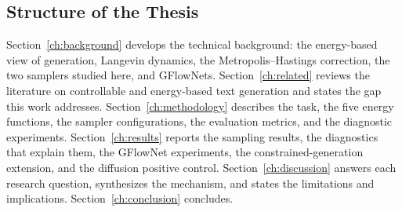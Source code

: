 \subsection{Structure of the Thesis}
\label{sec:intro-structure}

Section~\ref{ch:background} develops the technical background: the energy-based view of generation, Langevin dynamics, the Metropolis--Hastings correction, the two samplers studied here, and GFlowNets. Section~\ref{ch:related} reviews the literature on controllable and energy-based text generation and states the gap this work addresses. Section~\ref{ch:methodology} describes the task, the five energy functions, the sampler configurations, the evaluation metrics, and the diagnostic experiments. Section~\ref{ch:results} reports the sampling results, the diagnostics that explain them, the GFlowNet experiments, the constrained-generation extension, and the diffusion positive control. Section~\ref{ch:discussion} answers each research question, synthesizes the mechanism, and states the limitations and implications. Section~\ref{ch:conclusion} concludes.
